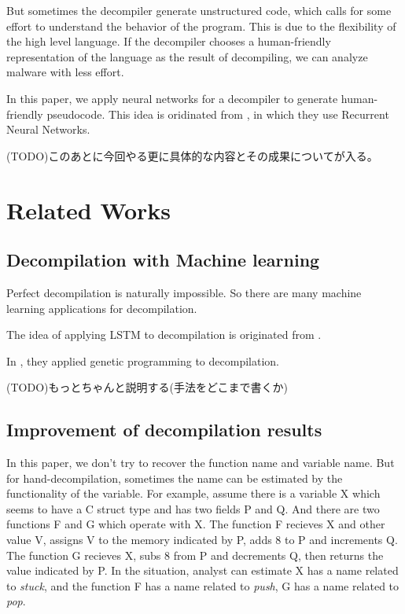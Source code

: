 \documentclass[senior,final,11pt]{iscs-thesis}
\begin{document}
But sometimes the decompiler generate  unstructured code, which calls for some effort to understand the behavior of the program. 
This is due to the flexibility of the high level language. If the decompiler chooses a human-friendly representation of the language as the result of decompiling, we can analyze malware with less effort. 

In this paper, we apply neural networks for a decompiler to generate human-friendly pseudocode. 
This idea is oridinated from \cite{Motoneta}, in which they use Recurrent Neural Networks.

(TODO)このあとに今回やる更に具体的な内容とその成果についてが入る。

\section{Related Works}
\subsection{Decompilation with Machine learning}
Perfect decompilation is naturally impossible. So there are many machine learning applications for decompilation.

The idea of applying LSTM to decompilation is originated from \cite{Motoneta}. 


In \cite{genetic_decompiler}, they applied genetic programming to decompilation.

(TODO)もっとちゃんと説明する(手法をどこまで書くか)


% 



\subsection{Improvement of decompilation results}
In this paper, we don't try to recover the function name and variable name. 
But for hand-decompilation, sometimes the name can be estimated by the functionality of the variable.
For example, assume there is a variable X which seems to have a C struct type and has two fields P and Q.
And there are two functions F and G which operate with X. 
The function F recieves X and other value V, assigns V to the memory indicated by P, adds 8 to P and increments Q. 
The function G recieves X, subs 8 from P and decrements Q, then returns the value indicated by P.
In the situation, analyst can estimate X has a name related to {\sl stuck}, and the function F has a name related to {\sl push}, G has a name related to {\sl pop}.
\end{document}
